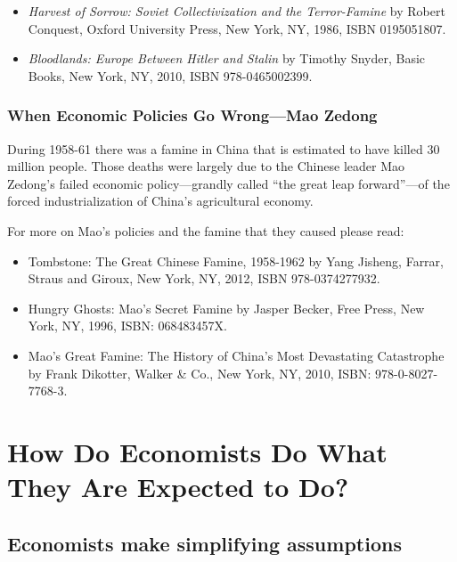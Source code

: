 \documentclass[
  letterpaper,
]{book}
\begin{document}
\begin{itemize}
\item
  \emph{Harvest of Sorrow: Soviet Collectivization and the
  Terror-Famine} by Robert Conquest, Oxford University Press, New York,
  NY, 1986, ISBN 0195051807.
\item
  \emph{Bloodlands: Europe Between Hitler and Stalin} by Timothy Snyder,
  Basic Books, New York, NY, 2010, ISBN 978-0465002399.
\end{itemize}

\subsubsection{When Economic Policies Go Wrong---Mao
Zedong}\label{when-economic-policies-go-wrongmao-zedong}

During 1958-61 there was a famine in China that is estimated to have
killed 30 million people. Those deaths were largely due to the Chinese
leader Mao Zedong's failed economic policy---grandly called ``the great
leap forward''---of the forced industrialization of China's agricultural
economy.

For more on Mao's policies and the famine that they caused please read:

\begin{itemize}
\item
  Tombstone: The Great Chinese Famine, 1958-1962 by Yang Jisheng,
  Farrar, Straus and Giroux, New York, NY, 2012, ISBN 978-0374277932.
\item
  Hungry Ghosts: Mao's Secret Famine by Jasper Becker, Free Press, New
  York, NY, 1996, ISBN: 068483457X.
\item
  Mao's Great Famine: The History of China's Most Devastating
  Catastrophe by Frank Dikotter, Walker \& Co., New York, NY, 2010,
  ISBN: 978-0-8027-7768-3.
\end{itemize}

\section{How Do Economists Do What They Are Expected to
Do?}\label{how-do-economists-do-what-they-are-expected-to-do}

\subsection{Economists make simplifying
assumptions}\label{economists-make-simplifying-assumptions}
\end{document}
